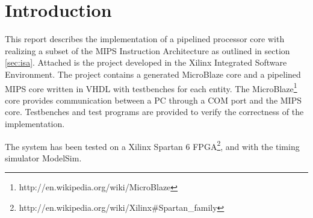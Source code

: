 \section{Introduction}

This report describes the implementation of a pipelined processor core with realizing a subset of the MIPS Instruction Architecture as outlined in section \ref{sec:isa}. Attached is the project developed in the Xilinx Integrated Software Environment. The project contains a generated MicroBlaze core and a pipelined MIPS core written in VHDL with testbenches for each entity. The MicroBlaze\footnote{http://en.wikipedia.org/wiki/MicroBlaze} core provides communication between a PC through a COM port and the MIPS core. Testbenches and test programs are provided to verify the correctness of the implementation. 

The system has been tested on a Xilinx Spartan 6 FPGA\footnote{http://en.wikipedia.org/wiki/Xilinx\#Spartan\_family}, and with the timing simulator ModelSim.